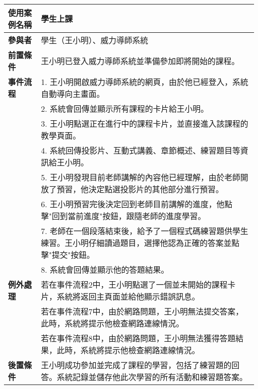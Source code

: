 \documentclass[12pt]{article}
\begin{document}
\begin{table}[H]
  \centering
  \begin{tabular}{|l|p{14cm}|}
  \hline
  \textbf{使用案例名稱} & 學生上課 \\ 
  \hline
  \textbf{參與者} & 學生（王小明）、威力導師系統 \\ 
  \hline
  \textbf{前置條件} & 王小明已登入威力導師系統並準備參加即將開始的課程。 \\ 
  \hline
  \textbf{事件流程} 
  & 1. 王小明開啟威力導師系統的網頁，由於他已經登入，系統自動導向主畫面。 \\
  & 2. 系統會回傳並顯示所有課程的卡片給王小明。 \\
  & 3. 王小明點選正在進行中的課程卡片，並直接進入該課程的教學頁面。 \\
  & 4. 系統回傳投影片、互動式講義、章節概述、練習題目等資訊給王小明。 \\
  & 5. 王小明發現目前老師講解的內容他已經理解，由於老師開放了預習，他決定點選投影片的其他部分進行預習。 \\
  & 6. 王小明預習完後決定回到老師目前講解的進度，他點擊"回到當前進度"按鈕，跟隨老師的進度學習。 \\
  & 7. 老師在一個段落結束後，給予了一個程式碼練習題供學生練習。王小明仔細讀過題目，選擇他認為正確的答案並點擊"提交"按鈕。 \\ 
  & 8. 系統會回傳並顯示他的答題結果。 \\
  \hline
  \textbf{例外處理} 
  & 若在事件流程2中，王小明點選了一個並未開始的課程卡片，系統將返回主頁面並給他顯示錯誤訊息。 \\
  & 若在事件流程7中，由於網路問題，王小明無法提交答案，此時，系統將提示他檢查網路連線情況。 \\
  & 若在事件流程8中，由於網路問題，王小明無法獲得答題結果，此時，系統將提示他檢查網路連線情況。 \\
  \hline
  \textbf{後置條件} 
  & 王小明成功參加並完成了課程的學習，包括了練習題的回答。系統記錄並儲存他此次學習的所有活動和練習題答案。 \\
  \hline
  \end{tabular}
\end{table}
\end{document}
